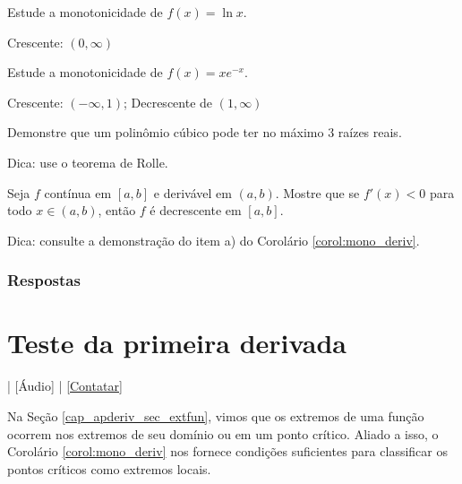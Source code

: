 \begin{exer}
  Estude a monotonicidade de $\displaystyle f(x) = \ln x$.
\end{exer}
\begin{resp}
  Crescente: $(0, \infty)$
\end{resp}

\begin{exer}
  Estude a monotonicidade de $\displaystyle f(x) = xe^{-x}$.
\end{exer}
\begin{resp}
  Crescente: $(-\infty, 1)$; Decrescente de $(1, \infty)$
\end{resp}

\begin{exer}
  Demonstre que um polinômio cúbico pode ter no máximo $3$ raízes reais.
\end{exer}
\begin{resp}
  Dica: use o teorema de Rolle.
\end{resp}

\begin{exer}\label{exer:mono_deriv}
  Seja $f$ contínua em $[a,b]$ e derivável em $(a,b)$. Mostre que se $f'(x)<0$ para todo $x\in (a,b)$, então $f$ é decrescente em $[a, b]$. 
\end{exer}
\begin{resp}
  Dica: consulte a demonstração do item a) do Corolário \ref{corol:mono_deriv}.
\end{resp}

\ifisbook
\subsubsection{Respostas}
\shipoutAnswer
\fi


\section{Teste da primeira derivada}\label{cap_apderiv_sec_tder1}

\begin{flushright}
  [Vídeo] | [Áudio] | \href{https://phkonzen.github.io/notas/contato.html}{[Contatar]}
\end{flushright}

Na Seção \ref{cap_apderiv_sec_extfun}, vimos que os extremos de uma função ocorrem nos extremos de seu domínio ou em um ponto crítico. Aliado a isso, o Corolário \ref{corol:mono_deriv} nos fornece condições suficientes para classificar os pontos críticos como extremos locais.

